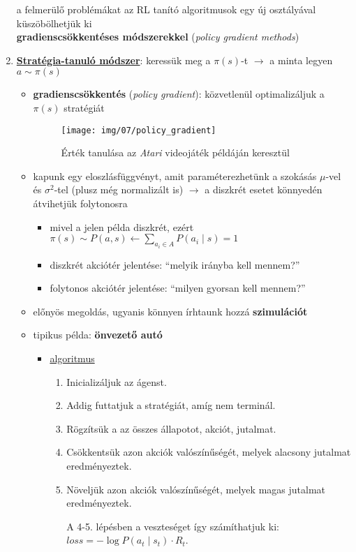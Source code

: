 \documentclass[a4paper, 11pt]{article}
\begin{document}
\begin{enumerate}
\begin{center}
		a felmerülő problémákat az RL tanító algoritmusok egy új osztályával küszöbölhetjük ki \\
		\textbf{gradienscsökkentéses módszerekkel} (\textit{policy gradient methods})
	\end{center}
	\pagebreak
	\item \underline{\textbf{Stratégia-tanuló módszer}}: keressük meg a $\pi(s)$-t $\to$ a minta legyen $a \sim \pi(s)$
	\begin{itemize}
		\item \textbf{gradienscsökkentés} (\textit{policy gradient}): közvetlenül optimalizáljuk a $\pi(s)$ stratégiát
		\begin{figure}[h!]
			\centering
			\texttt{[image: img/07/policy\_gradient]}
			\caption{Érték tanulása az \textit{Atari} videojáték példáján keresztül}
		\end{figure}
		\item kapunk egy eloszlásfüggvényt, amit paraméterezhetünk a szokásás $\mu$-vel és $\sigma^2$-tel (plusz még normalizált is) $\to$ a diszkrét esetet könnyedén átvihetjük folytonosra
		\begin{itemize}
			\item mivel a jelen példa diszkrét, ezért $\pi(s) \sim P(a, s) \longleftarrow \sum\limits_{a_i \in A} P(a_i \mid s) = 1$
			\item diszkrét akciótér jelentése: ``melyik irányba kell mennem?''
			\item folytonos akciótér jelentése: ``milyen gyorsan kell mennem?''
		\end{itemize}
		\item előnyös megoldás, ugyanis könnyen írhtaunk hozzá \textbf{szimulációt}
		\item tipikus példa: \textbf{önvezető autó}
		\begin{itemize}
			\item \underline{algoritmus}
			\begin{enumerate}
				\item Inicializáljuk az ágenst.
				\item Addig futtatjuk a stratégiát, amíg nem terminál.
				\item Rögzítsük a az összes állapotot, akciót, jutalmat.
				\item Csökkentsük azon akciók valószínűségét, melyek alacsony jutalmat eredményeztek.
				\item Növeljük azon akciók valószínűségét, melyek magas jutalmat eredményeztek.
				
				\begin{footnotesize}
					A 4-5. lépésben a veszteséget így számíthatjuk ki: $loss = -\log P(a_t \mid s_t) \cdot R_t$.
					

\end{footnotesize}
\end{enumerate}
\end{itemize}
\end{itemize}
\end{enumerate}
\end{document}
